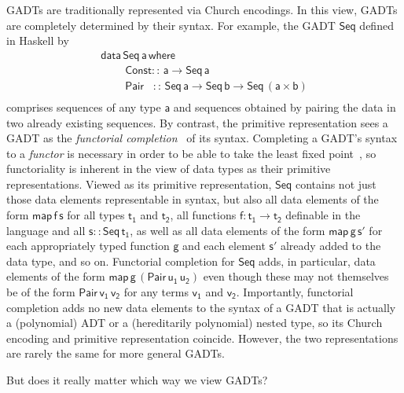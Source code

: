 \documentclass[acmsmall,screen,review,anonymous]{acmart}
\theoremstyle{definition}
\begin{document}
GADTs are traditionally represented via Church encodings. In this
view, GADTs are completely determined by their syntax. For example,
the GADT $\mathsf{Seq}$ defined in Haskell by
\begin{equation}\label{eq:seq}
\begin{array}{l}
\mathsf{data\, Seq\,a\,where}\\
\mathsf{\;\;\;\;\;\;\;\;Const ::\, a \to Seq\,a}\\
\mathsf{\;\;\;\;\;\;\;\;Pair\,\,\,\,\, ::\, Seq \,a \to Seq\,b \to
  Seq\,(a \times b)}\\ 
\end{array}
\end{equation}
\noindent
comprises sequences of any type $\mathsf{a}$ and sequences obtained by
pairing the data in two already existing sequences. By contrast, the
primitive representation sees a GADT as the {\em functorial
  completion}~\cite{jp19} of its syntax. Completing a GADT's syntax to
a {\em functor} is necessary in order to be able to take the least
fixed point~\cite{tfca}, so functoriality is inherent in the view of
data types as their primitive representations. Viewed as its primitive
representation, $\mathsf{Seq}$ contains not just those data elements
representable in syntax, but also all data elements of the form
$\mathsf{map\,f\,s}$ for all types $\mathsf{t_1}$ and $\mathsf{t_2}$,
all functions $\mathsf{f : t_1 \to t_2}$ definable in the language and
all $\mathsf{s :: Seq\,t_1}$, as well as all data elements of the form
$\mathsf{map\,g\,s'}$ for each appropriately typed function
$\mathsf{g}$ and each element $\mathsf{s'}$ already added to the data
type, and so on. Functorial completion for $\mathsf{Seq}$ adds, in
particular, data elements of the form
$\mathsf{map\,g\,(Pair\,u_1\,u_2)}$ even though these may not
themselves be of the form $\mathsf{Pair\,v_1\,v_2}$ for any terms
$\mathsf{v_1}$ and $\mathsf{v_2}$. Importantly, functorial completion
adds no new data elements to the syntax of a GADT that is actually a
(polynomial) ADT or a (hereditarily polynomial) nested type, so its
Church encoding and primitive representation coincide. However, the
two representations are rarely the same for more general GADTs.

But does it really matter which way we view GADTs?
\end{document}
